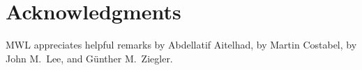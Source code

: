\documentclass[10pt,a4paper]{article}
\begin{document}



\section*{Acknowledgments}
MWL appreciates helpful remarks by Abdellatif Aitelhad, by Martin Costabel, by John M.\ Lee, and G\"unther M.\ Ziegler.



\end{document}
